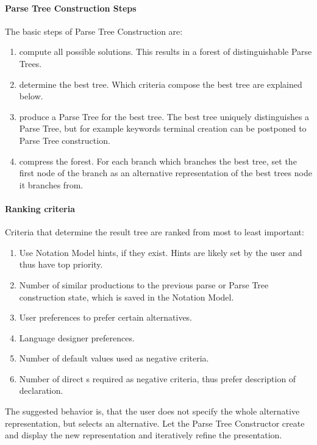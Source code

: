 \paragraph{Parse Tree Construction Steps}
The basic steps of Parse Tree Construction are:
\begin{enumerate}
	\item compute all possible solutions. This results in a forest of distinguishable Parse Trees.
	\item determine the best tree. Which criteria compose the best tree are explained below.
	\item produce a Parse Tree for the best tree. The best tree uniquely distinguishes a Parse Tree, but for example keywords terminal creation can be postponed to Parse Tree construction.
	\item compress the forest. For each branch which branches the best tree, set the first node of the branch as an alternative representation of the best trees node it branches from.\\
\end{enumerate}

\paragraph{Ranking criteria} Criteria that determine the result tree are ranked from most to least important:
\begin{enumerate}
	\item Use Notation Model hints, if they exist. Hints are likely set by the user and thus have top priority.
	\item Number of similar productions to the previous parse or Parse Tree construction state, which is saved in the Notation Model.
	\item User preferences to prefer certain alternatives.
	\item Language designer preferences.
	\item Number of default values used as negative criteria.
	\item Number of direct s required as negative criteria, thus prefer description of declaration.
\end{enumerate}

The suggested behavior is, that the user does not specify the whole alternative representation, but selects an alternative. Let the Parse Tree Constructor create and display the new representation and iteratively refine the presentation. 


